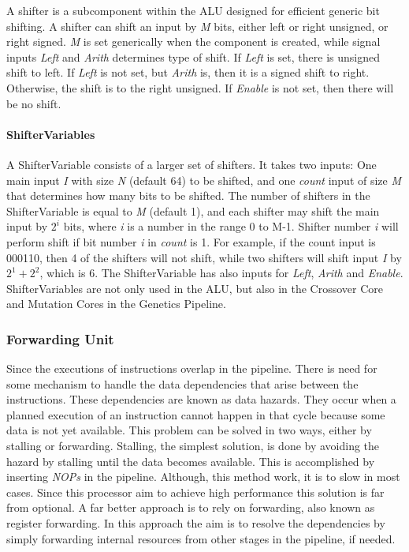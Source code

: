 A shifter is a subcomponent within the ALU designed for efficient generic bit shifting.
A shifter can shift an input by \emph{M} bits, either left or right unsigned, or right signed. \emph{M} is set generically when the component is created, while signal inputs  \emph{Left} and \emph{Arith} determines type of shift. 
If \emph{Left} is set, there is unsigned shift to left.
If \emph{Left} is not set, but \emph{Arith} is, then it is a signed shift to right.
Otherwise, the shift is to the right unsigned.
If \emph{Enable} is not set, then there will be no shift.

\paragraph{ShifterVariables}
A ShifterVariable consists of a larger set of shifters. 
It takes two inputs: One main input \emph{I} with size \emph{N} (default 64) to be shifted, and one \emph{count} input of size \emph{M} that determines how many bits to be shifted. 
The number of shifters in the ShifterVariable is equal to \emph{M} (default 1), and each shifter may shift the main input by $2^i$ bits, where \emph{i} is a number in the range 0 to M-1. 
Shifter number \emph{i} will perform shift if bit number \emph{i} in \emph{count} is 1. 
For example, if the count input is 000110, then 4 of the shifters will not shift, while two shifters will shift input \emph{I} by $2^1 + 2^2$, which is 6.
The ShifterVariable has also inputs for \emph{Left}, \emph{Arith} and \emph{Enable}.
ShifterVariables are not only used in the ALU, but also in the Crossover Core and Mutation Cores in the Genetics Pipeline.



\subsubsection{Forwarding Unit} \label{fpga:fitness:sss:forwarding_unit}
Since the executions of instructions overlap in the pipeline.
There is need for some mechanism to handle the data dependencies that arise between the instructions. These dependencies are known as data hazards. They occur when a planned execution of an instruction cannot happen in that cycle because some data is not yet available. This problem can be solved in two ways, either by stalling or forwarding. Stalling, the simplest solution, is done by avoiding the hazard by stalling until the data becomes available. This is accomplished by inserting \emph{NOPs} in the pipeline. Although, this method work, it is to slow in most cases. Since this processor aim to achieve high performance this solution is far from optional. A far better approach is to rely on forwarding, also known as register forwarding. In this approach the aim is to resolve the dependencies by simply forwarding internal resources from other stages in the pipeline, if needed.

